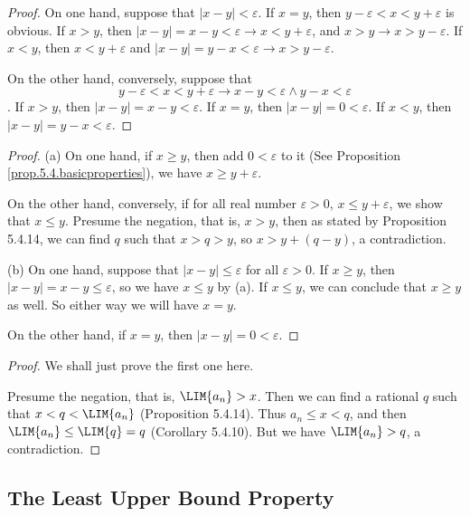 \begin{proof}
On one hand, suppose that $|x-y|<\varepsilon$. If $x=y$, then $y-\varepsilon<x<y+\varepsilon$ is obvious. If $x>y$, then 
$|x-y|=x-y<\varepsilon \rightarrow x<y+\varepsilon$, and $x>y \rightarrow x>y-\varepsilon$. If $x<y$, then 
$x<y+\varepsilon$ and $|x-y|=y-x<\varepsilon\rightarrow x>y-\varepsilon$.

On the other hand, conversely, suppose that 
\[
y-\varepsilon<x<y+\varepsilon \rightarrow x-y<\varepsilon \wedge y-x<\varepsilon
\]. If $x>y$, then $|x-y|=x-y<\varepsilon$. If $x=y$, then $|x-y|=0<\varepsilon$. If $x<y$, then 
$|x-y|=y-x<\varepsilon$.
\end{proof}

\begin{proof}
(a)
On one hand, if $x\geq y$, then add $0<\varepsilon$ to it (See Proposition \ref{prop.5.4.basicproperties}), we have 
$x \geq y+\varepsilon$.

On the other hand, conversely, if for all real number $\varepsilon>0$, $x \leq y+\varepsilon$, we show that $x\leq y$. 
Presume the negation, that is, $x>y$, then as stated by Proposition 5.4.14, we can find $q$ such that $x>q>y$, so 
$x>y+(q-y)$, a contradiction.

(b)
On one hand, suppose that $|x-y|\leq \varepsilon$ for all $\varepsilon>0$. If $x\geq y$, then 
$|x-y|=x-y \leq \varepsilon$, so we have $x\leq y$ by (a). If $x\leq y$, we can conclude that $x\geq y$ as well. So 
either way we will have $x=y$.

On the other hand, if $x=y$, then $|x-y|=0<\varepsilon$.
\end{proof}

\begin{proof}
We shall just prove the first one here.

Presume the negation, that is, $\LIM{a_n}>x$. Then we can find a rational $q$ such that $x<q<\LIM{a_n}$
(Proposition 5.4.14). Thus
$a_n\leq x<q$,
and then $\LIM{a_n}\leq\LIM{q}=q$ (Corollary 5.4.10). But we have $\LIM{a_n}>q$, a contradiction.
\end{proof}

\subsection{The Least Upper Bound Property}

